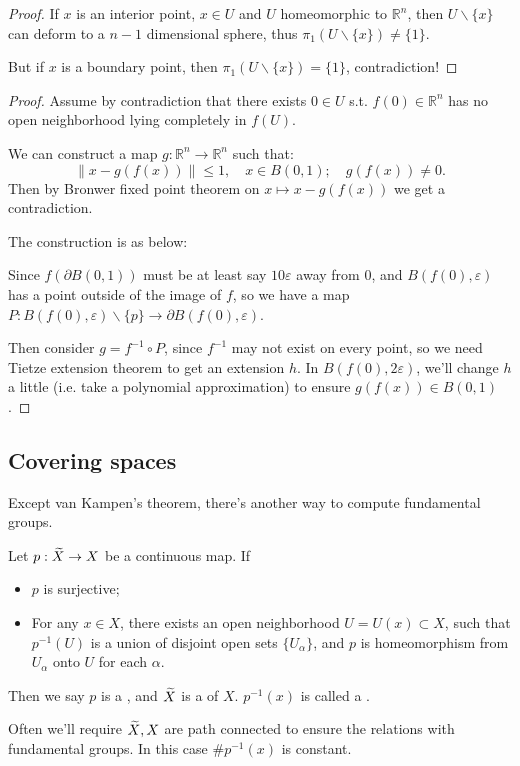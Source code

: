 \begin{proof}[Proof]
    If $x$ is an interior point, $x\in U$ and $U$ homeomorphic to $\mathbb{R}^{n}$,
	then $U \backslash \{x\}$ can deform to a $n-1$ dimensional sphere,
	thus $\pi_1(U\backslash\{x\}) \ne \{1\}$.

	But if $x$ is a boundary point, then $\pi_1(U \backslash\{x\}) = \{1\}$,
	contradiction!
\end{proof}

\begin{proof}[Proof]
    Assume by contradiction that there exists $0\in U$ s.t.
	$f(0)\in \mathbb{R}^{n}$ has no open neighborhood lying completely
	in $f(U)$.

	We can construct a map $g: \mathbb{R}^{n}\to \mathbb{R}^{n}$ such that:
	\[
	\lVert x - g(f(x)) \rVert \le 1,\quad x\in B(0, 1);
	\quad g(f(x)) \ne 0.
	\]
	Then by Bronwer fixed point theorem on $x\mapsto x - g(f(x))$
	we get a contradiction.

	The construction is as below:

	Since $f(\partial B(0, 1))$ must be at least say $10\varepsilon$ away from 0,
	and $B(f(0), \varepsilon)$ has a point outside of the image of $f$,
	so we have a map $P: B(f(0), \varepsilon)\backslash\{p\}\to
	\partial B(f(0), \varepsilon)$.

	Then consider $g = f^{-1}\circ P$, since $f^{-1}$ may not exist on every point,
	so we need Tietze extension theorem to get an extension $h$.
	In $B(f(0), 2\varepsilon)$, we'll change $h$ a little (i.e. take a
	polynomial approximation) to ensure $g(f(x)) \in B(0, 1)$.
\end{proof}

\subsection{Covering spaces}
\label{sub:Covering spaces}
Except van Kampen's theorem, there's another way to compute fundamental groups.
\begin{definition}
	Let $p: \widetilde{X} \to X$ be a continuous map. If
	\begin{itemize}
		\item $p$ is surjective;
		\item For any $x\in X$, there exists an open neighborhood $U=U(x) \subset X$,
			such that $p^{-1}(U)$ is a union of disjoint open sets $\{U_\alpha\}$,
			and $p$ is homeomorphism from $U_\alpha$ onto $U$ for each $\alpha$.
	\end{itemize}
	Then we say $p$ is a , and $\widetilde{X}$ is a
	 of $X$.
	$p^{-1}(x)$ is called a .
\end{definition}
\begin{remark}
    Often we'll require $\widetilde{X}, X$ are path connected to ensure the relations
	with fundamental groups. In this case $\# p^{-1}(x)$ is constant.
\end{remark}

